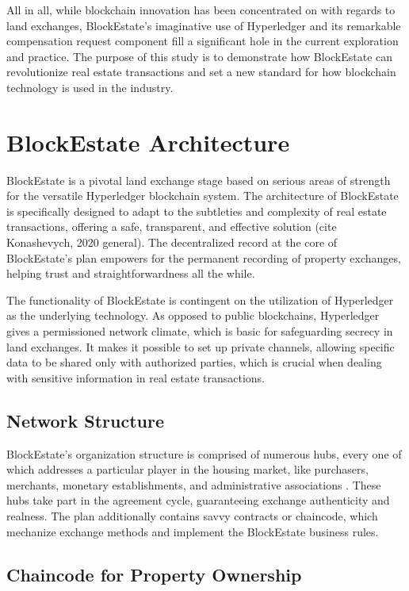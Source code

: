 \documentclass[3p,times]{elsarticle}
\begin{document}
All in all, while blockchain innovation has been concentrated on with regards to land exchanges, BlockEstate's imaginative use of Hyperledger and its remarkable compensation request component fill a significant hole in the current exploration and practice. The purpose of this study is to demonstrate how BlockEstate can revolutionize real estate transactions and set a new standard for how blockchain technology is used in the industry.

\section{BlockEstate Architecture}

BlockEstate is a pivotal land exchange stage based on serious areas of strength for the versatile Hyperledger blockchain \cite{bhanushali2020blockchain} system. The architecture of BlockEstate is specifically designed to adapt to the subtleties and complexity of real estate transactions, offering a safe, transparent, and effective solution (cite Konashevych, 2020 general). The decentralized record at the core of BlockEstate's plan empowers for the permanent recording of property exchanges, helping trust and straightforwardness all the while.


The functionality of BlockEstate is contingent on the utilization of Hyperledger as the underlying technology. As opposed to public blockchains, Hyperledger gives a permissioned network climate, which is basic for safeguarding secrecy in land exchanges. It makes it possible to set up private channels, allowing specific data to be shared only with authorized parties, which is crucial when dealing with sensitive information in real estate transactions.


\subsection{Network Structure}

BlockEstate's organization structure is comprised of numerous hubs, every one of which addresses a particular player in the housing market, like purchasers, merchants, monetary establishments, and administrative associations \cite{ferreira2021blockchain}. These hubs take part in the agreement cycle, guaranteeing exchange authenticity and realness. The plan additionally contains savvy contracts or chaincode, which mechanize exchange methods and implement the BlockEstate \cite{hoxha2019study} business rules.


\subsection{Chaincode for Property Ownership}
\end{document}
